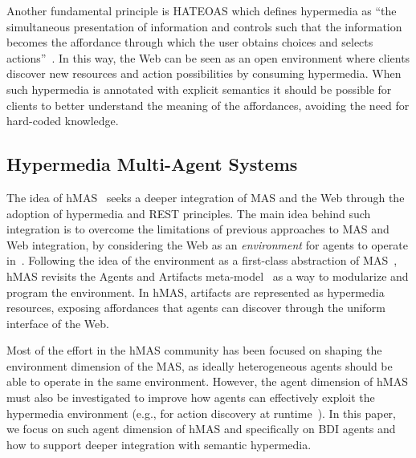 \documentclass[
]{ceurart}
\begin{document}
Another fundamental principle is \ac{HATEOAS} which defines hypermedia as ``the simultaneous presentation of information and controls such that the information becomes the affordance through which the user obtains choices and selects actions''~\cite{DBLP:journals/toit/FieldingT02}.
In this way, the Web can be seen as an open environment
where clients discover new resources and action possibilities by consuming hypermedia.
%
When such hypermedia is annotated with explicit semantics it should be possible for clients to better understand the meaning of the affordances, avoiding the need for hard-coded knowledge.
%


\subsection{Hypermedia Multi-Agent Systems}

The idea of \ac{hMAS}~\cite{DBLP:conf/atal/CiorteaMGBRZ19} seeks a deeper integration of \ac{MAS} and the Web through the adoption of hypermedia and \ac{REST} principles.
%
The main idea behind such integration is to overcome the limitations of previous approaches to \ac{MAS} and Web integration, by considering the Web as an \emph{environment} for agents to operate in~\cite{ciortea2018emas}.
%
Following the idea of the environment as a first-class abstraction of \ac{MAS}~\cite{weyns2007aamas},
\ac{hMAS} revisits the Agents and Artifacts meta-model~\cite{ricci2011aamas} as a way to modularize and program the environment.
%
In \ac{hMAS}, artifacts are represented as hypermedia resources, exposing affordances that agents can discover through the uniform interface of the Web.

Most of the effort in the \ac{hMAS} community has been focused on shaping the environment dimension of the \ac{MAS}, as ideally heterogeneous agents should be able to operate in the same environment.
%
However, the agent dimension of \ac{hMAS} must also be investigated to improve how agents can effectively exploit the hypermedia environment (e.g., for action discovery at runtime~\cite{vachtsevanou2024atal}).
%
In this paper, we focus on such agent dimension of \ac{hMAS} and specifically on \ac{BDI} agents and how to support deeper integration with semantic hypermedia.
\end{document}

